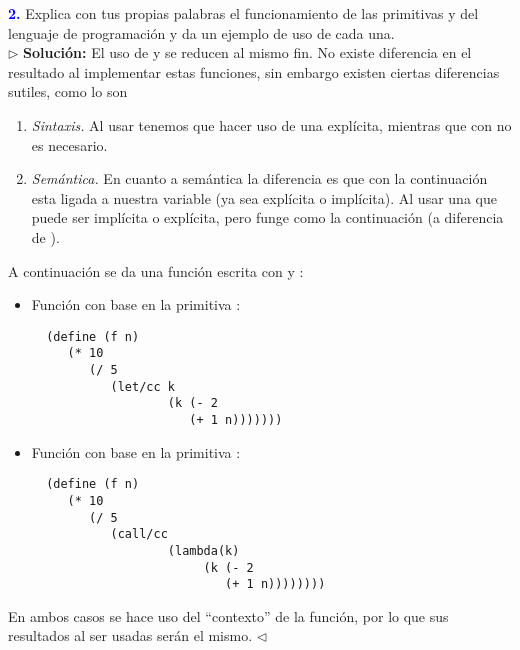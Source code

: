 \Large\textbf{\textcolor{blue}{2.}}
Explica con tus propias palabras el funcionamiento de las primitivas  y
 del lenguaje de programación  y da un ejemplo de uso de cada una.\\

$\rhd$ \textbf{Solución:} El uso de  y  se reducen al mismo fin.
No existe diferencia en el resultado al implementar estas funciones, sin embargo existen ciertas
diferencias sutiles, como lo son
\begin{enumerate}
\item \textit{Sintaxis.} Al usar  tenemos que hacer uso de una  explícita,
mientras que con  no es necesario.
\item \textit{Semántica.} En cuanto a semántica la diferencia es que con  la continuación
esta ligada a nuestra variable  (ya sea explícita o implícita). Al usar  una
 que puede ser implícita o explícita, pero funge como la continuación (a diferencia de ).
\end{enumerate}
A continuación se da una función escrita con  y :
\begin{itemize}
\item Función con base en la primitiva :
\begin{lstlisting}
  (define (f n)
     (* 10
        (/ 5
           (let/cc k
                   (k (- 2
                      (+ 1 n)))))))
\end{lstlisting}
\item Función con base en la primitiva :
\begin{lstlisting}
  (define (f n)
     (* 10
        (/ 5
           (call/cc
                   (lambda(k)
                        (k (- 2
                           (+ 1 n))))))))
\end{lstlisting}
\end{itemize}
En ambos casos se hace uso del ``contexto'' de la función, por lo que sus resultados al ser usadas
serán el mismo.
\hfill $\lhd$
\newpage


